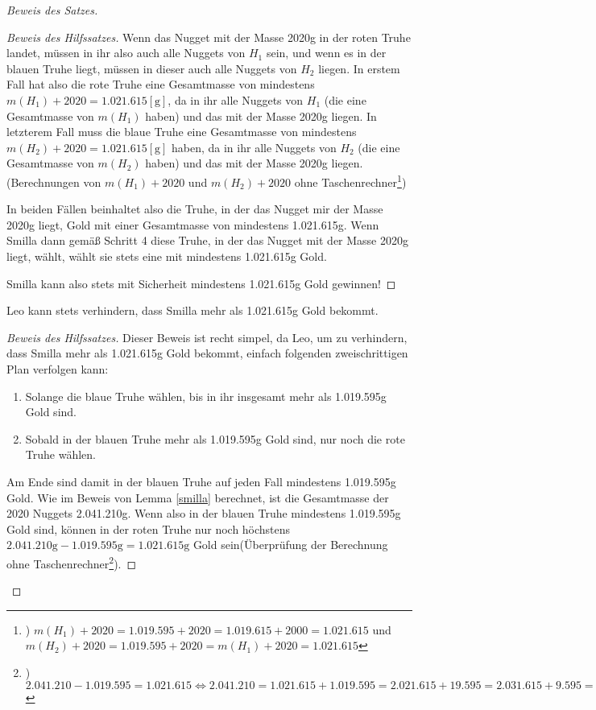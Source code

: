 \begin{proof}[Beweis des Satzes]
\begin{proof}[Beweis des Hilfssatzes]
        Wenn das Nugget mit der Masse 2020g in der roten Truhe landet, müssen in ihr also auch alle Nuggets von $H_1$ 
        sein, und wenn es in der blauen Truhe liegt, müssen in dieser auch alle Nuggets von $H_2$ liegen. In erstem 
        Fall hat also die rote Truhe eine Gesamtmasse von mindestens $m(H_1)+2020=1.021.615 [\text{g}]$, da in ihr 
        alle Nuggets von $H_1$ (die eine Gesamtmasse von $m(H_1)$ haben) und das mit der Masse 2020g liegen. In 
        letzterem Fall muss die blaue Truhe eine Gesamtmasse von mindestens $m(H_2)+2020=1.021.615 [\text{g}]$ haben,
        da in ihr alle Nuggets von $H_2$ (die eine Gesamtmasse von $m(H_2)$ haben) und das mit der Masse 2020g 
        liegen. (Berechnungen von $m(H_1)+2020$ und $m(H_2)+2020$ ohne Taschenrechner\footnote{) $m(H_1)+2020=
        1.019.595+2020=1.019.615+2000=1.021.615$ und $m(H_2)+2020=1.019.595+2020=m(H_1)+2020=1.021.615$})

        In beiden Fällen beinhaltet also die Truhe, in der das Nugget mir der Masse 2020g liegt, Gold mit einer 
        Gesamtmasse von mindestens 1.021.615g. Wenn Smilla dann gemäß Schritt 4 diese Truhe, in der das Nugget mit 
        der Masse 2020g liegt, wählt, wählt sie stets eine mit mindestens 1.021.615g Gold.

        Smilla kann also stets mit Sicherheit mindestens 1.021.615g Gold gewinnen!
    \end{proof}
    \begin{lem}\label{leo}
        Leo kann stets verhindern, dass Smilla mehr als 1.021.615g Gold bekommt.
    \end{lem}
    \begin{proof}[Beweis des Hilfssatzes]
        Dieser Beweis ist recht simpel, da Leo, um zu verhindern, dass Smilla mehr als 1.021.615g Gold bekommt, 
        einfach folgenden zweischrittigen Plan verfolgen kann:
        \begin{enumerate}
            \item Solange die blaue Truhe wählen, bis in ihr insgesamt mehr als 1.019.595g Gold sind.
            \item Sobald in der blauen Truhe mehr als 1.019.595g Gold sind, nur noch die rote Truhe wählen.
        \end{enumerate}
        Am Ende sind damit in der blauen Truhe auf jeden Fall mindestens 1.019.595g Gold. Wie im Beweis von Lemma 
        \ref{smilla} berechnet, ist die Gesamtmasse der 2020 Nuggets 2.041.210g. Wenn also in der blauen Truhe 
        mindestens 1.019.595g Gold sind, können in der roten Truhe nur noch höchstens $2.041.210\text{g}-1.019.595
        \text{g}=1.021.615\text{g}$ Gold sein(Überprüfung der Berechnung ohne Taschenrechner\footnote{) $2.041.210-
        1.019.595=1.021.615\Leftrightarrow 2.041.210=1.021.615+1.019.595=2.021.615+19.595=2.031.615+9.595=2.040.615
        +595=2.041.115+95=2.041.210$}).


\end{proof}
\end{proof}
